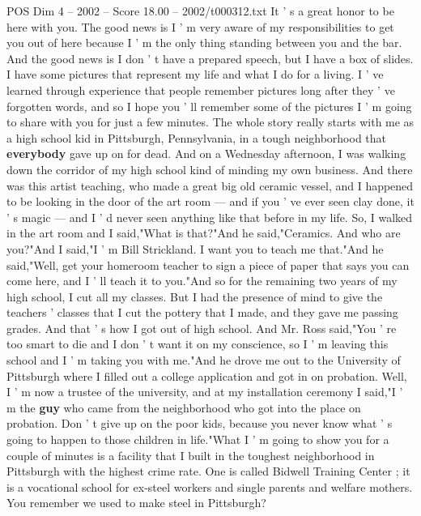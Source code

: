 \begin{textsample}{POS Dim 4 – 2002 – Score 18.00 – 2002/t000312.txt}  \label{ex:f4_pos_024}
It ' s a great honor to be here with you.
The good news is I ' m very aware of my responsibilities to get you out of here because I ' m the only thing standing between you and the bar.
And the good news is I don ' t have a prepared speech, but I have a box of slides.
I have some pictures that represent my life and what I do for a living.
I ' ve learned through experience that people remember pictures long after they ' ve forgotten words, and so I hope you ' ll remember some of the pictures I ' m going to share with you for just a few minutes.
The whole story really starts with me as a high school kid in Pittsburgh, Pennsylvania, in a tough neighborhood that \textbf{everybody} gave up on for dead.
And on a Wednesday afternoon, I was walking down the corridor of my high school kind of minding my own business.
And there was this artist teaching, who made a great big old ceramic vessel, and I happened to be looking in the door of the art room — and if you ' ve ever seen clay done, it ' s magic — and I ' d never seen anything like that before in my life.
So, I walked in the art room and I said,"What is that?"And he said,"Ceramics.
And who are you?"And I said,"I ' m Bill Strickland.
I want you to teach me that."And he said,"Well, get your homeroom teacher to sign a piece of paper that says you can come here, and I ' ll teach it to you."And so for the remaining two years of my high school, I cut all my classes.
But I had the presence of mind to give the teachers ' classes that I cut the pottery that I made, and they gave me passing grades.
And that ' s how I got out of high school.
And Mr.
Ross said,"You ' re too smart to die and I don ' t want it on my conscience, so I ' m leaving this school and I ' m taking you with me."And he drove me out to the University of Pittsburgh where I filled out a college application and got in on probation.
Well, I ' m now a trustee of the university, and at my installation ceremony I said,"I ' m the \textbf{guy} who came from the neighborhood who got into the place on probation.
Don ' t give up on the poor kids, because you never know what ' s going to happen to those children in life."What I ' m going to show you for a couple of minutes is a facility that I built in the toughest neighborhood in Pittsburgh with the highest crime rate.
One is called Bidwell Training Center ; it is a vocational school for ex-steel workers and single parents and welfare mothers.
You remember we used to make steel in Pittsburgh?

\end{textsample}
